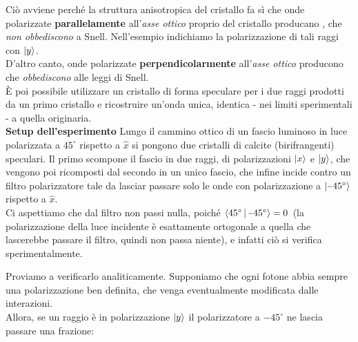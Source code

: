 \documentclass[FisicaTeorica.tex]{subfiles}
\begin{document}
Ciò avviene perché la struttura anisotropica del cristallo fa sì che onde polarizzate \textbf{parallelamente} all'\textit{asse ottico} proprio del cristallo producano , che \textit{non obbediscono} a Snell. Nell'esempio indichiamo la polarizzazione di tali raggi con $\Ket{y}$.\\
D'altro canto, onde polarizzate \textbf{perpendicolarmente} all'\textit{asse ottico} producono  che \textit{obbediscono} alle leggi di Snell.\\
È poi possibile utilizzare un cristallo di forma speculare per  i due raggi prodotti da un primo cristallo e ricostruire un'onda unica, identica - nei limiti sperimentali - a quella originaria.\\
\textbf{Setup dell'esperimento}  Lungo il cammino ottico di un fascio luminoso in luce polarizzata a $45^\circ$ rispetto a $\hat{x}$ si pongono due cristalli di calcite (birifrangenti) speculari. Il primo scompone il fascio in due raggi, di polarizzazioni $\Ket{x}$ e $\Ket{y}$, che vengono poi ricomposti dal secondo in un unico fascio, che infine incide contro un filtro polarizzatore tale da lasciar passare solo le onde con polarizzazione a $\ket{\minus 45^\circ}$ rispetto a $\hat{x}$.\\
Ci aspettiamo che dal filtro non passi nulla, poiché $\braket{45^\circ|\minus 45^\circ} = 0$ (la polarizzazione della luce incidente è esattamente ortogonale a quella che lascerebbe passare il filtro, quindi non passa niente), e infatti ciò si verifica sperimentalmente.\\
\begin{center}
 \end{center}
Proviamo a verificarlo analiticamente. Supponiamo che ogni fotone abbia sempre una polarizzazione ben definita, che venga eventualmente modificata dalle interazioni.\\
Allora, se un raggio è in polarizzazione $\Ket{y}$ il polarizzatore a $\minus 45^\circ$ ne lascia passare una frazione:
\end{document}
